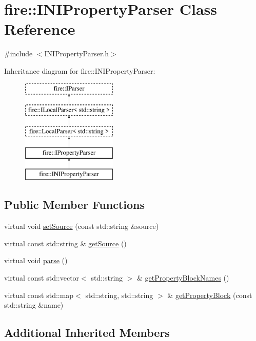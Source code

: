 \hypertarget{a01377}{}\section{fire\+:\+:I\+N\+I\+Property\+Parser Class Reference}
\label{a01377}


{\ttfamily \#include $<$I\+N\+I\+Property\+Parser.\+h$>$}

Inheritance diagram for fire\+:\+:I\+N\+I\+Property\+Parser\+:\begin{figure}[H]
\begin{center}
\leavevmode
\includegraphics[height=5.000000cm]{a01377}
\end{center}
\end{figure}
\subsection*{Public Member Functions}
\begin{DoxyCompactItemize}
\item 
virtual void \hyperlink{a01377_a06793909bc707a69d0c5772b14bc946d}{set\+Source} (const std\+::string \&source)
\item 
virtual const std\+::string \& \hyperlink{a01377_ad02c9a530f20a706d7bb2554813e8d3a}{get\+Source} ()
\item 
virtual void \hyperlink{a01377_a31b6bad01e65ed4bb5f1ba297616c641}{parse} ()
\item 
virtual const std\+::vector$<$ std\+::string $>$ \& \hyperlink{a01377_aed0f1f47111794659564dcddb4d25bc6}{get\+Property\+Block\+Names} ()
\item 
virtual const std\+::map$<$ std\+::string, std\+::string $>$ \& \hyperlink{a01377_a3591312590a66659ebd377cdde9ab9ad}{get\+Property\+Block} (const std\+::string \&name)
\end{DoxyCompactItemize}
\subsection*{Additional Inherited Members}


